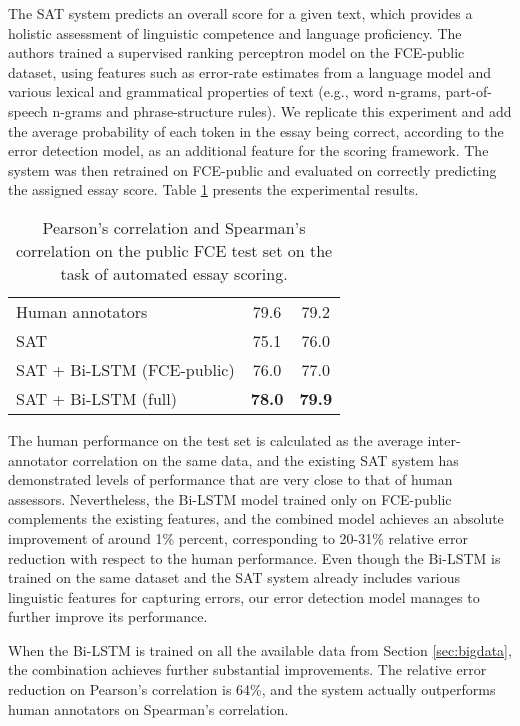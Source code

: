 \documentclass[11pt]{article}
\begin{document}
The SAT system predicts an overall score for a given text, which provides a holistic assessment of linguistic competence and language proficiency. The authors trained a supervised ranking perceptron model on the FCE-public dataset, using features such as error-rate estimates from a language model and various lexical and grammatical properties of text (e.g., word n-grams, part-of-speech n-grams and phrase-structure rules).
We replicate this experiment and add the average probability of each token in the essay being correct, according to the error detection model, as an additional feature for the scoring framework.
The system was then retrained on FCE-public and evaluated on correctly predicting the assigned essay score. 
Table \ref{tab:results_script} presents the experimental results. 

\begin{table}[h]
\centering
\begin{tabular}{lcc} \toprule
&  &  \\ \midrule
Human annotators & 79.6 & 79.2 \\
SAT & 75.1 & 76.0 \\
SAT + Bi-LSTM (FCE-public) & 76.0 & 77.0 \\
SAT + Bi-LSTM (full) & \textbf{78.0} & \textbf{79.9} \\ \bottomrule
\end{tabular}
\caption{Pearson's correlation   and Spearman's correlation  on the public FCE test set on the task of automated essay scoring.}
\label{tab:results_script}
\end{table}

The human performance on the test set is calculated as the average inter-annotator correlation on the same data, and the existing SAT system has demonstrated levels of performance that are very close to that of human assessors.
Nevertheless, the Bi-LSTM model trained only on FCE-public complements the existing features, and the combined model achieves an absolute improvement of around 1\% percent, corresponding to 20-31\% relative error reduction with respect to the human performance.
Even though the Bi-LSTM is trained on the same dataset and the SAT system already includes various linguistic features for capturing errors, our error detection model manages to further improve its performance.

When the Bi-LSTM is trained on all the available data from Section \ref{sec:bigdata}, the combination achieves further substantial improvements. The relative error reduction on Pearson's correlation is 64\%, and the system actually outperforms human annotators on Spearman's correlation.
\end{document}
